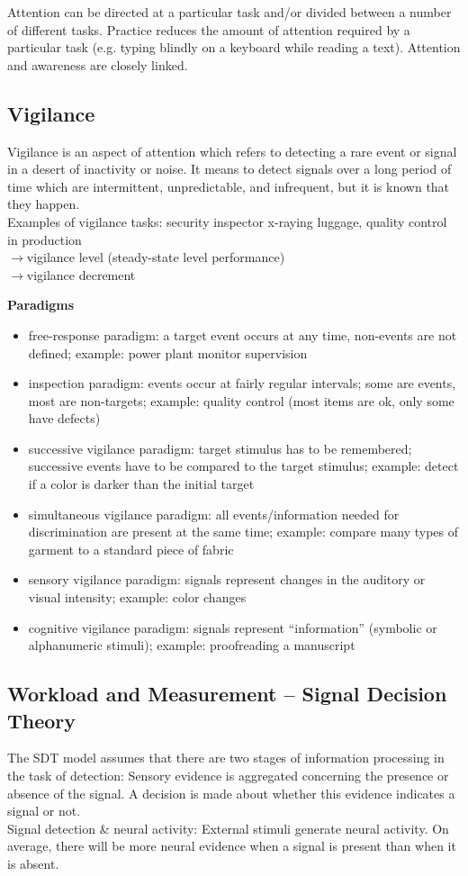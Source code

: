 Attention can be directed at a particular task and/or divided between a number of different tasks. Practice reduces the amount of attention required by a particular task (e.g. typing blindly on a keyboard while reading a text). Attention and awareness are closely linked.

\subsection{Vigilance}
Vigilance is an aspect of attention which refers to detecting a rare event or signal in a desert of inactivity or noise.
It means to detect signals over a long period of time which are intermittent, unpredictable, and infrequent, but it is known that they happen.\\
Examples of vigilance tasks: security inspector x-raying luggage, quality control in production\\
$\rightarrow$vigilance level (steady-state level performance)\\
$\rightarrow$vigilance decrement

\textbf{Paradigms}
\begin{itemize}
\item free-response paradigm: a target event occurs at any time, non-events are not defined; example: power plant monitor supervision
\item inspection paradigm: events occur at fairly regular intervals; some are events, most are non-targets; example: quality control (most items are ok, only some have defects)
\item successive vigilance paradigm: target stimulus has to be remembered; successive events have to be compared to the target stimulus; example: detect if a color is darker than the initial target
\item simultaneous vigilance paradigm: all events/information needed for discrimination are present at the same time; example: compare many types of garment to a standard piece of fabric
\item sensory vigilance paradigm: signals represent changes in the auditory or visual intensity; example: color changes
\item cognitive vigilance paradigm: signals represent ``information'' (symbolic or alphanumeric stimuli); example: proofreading a manuscript
\end{itemize}

\subsection{Workload and Measurement -- Signal Decision Theory}
The SDT model assumes that there are two stages of information processing in the task of detection: Sensory evidence is aggregated concerning the presence or absence of the signal. A decision is made about whether this evidence indicates a signal or not.\\
Signal detection \& neural activity: External stimuli generate neural activity. On average, there will be more neural evidence when a signal is present than when it is absent.\\

